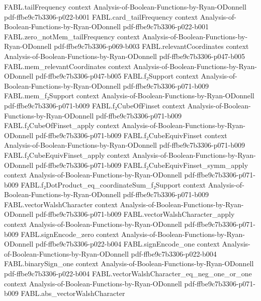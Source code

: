\begin{theorem}
\proofstep
  {FABL.tailFrequency}
  {context}
  {Analysis-of-Boolean-Functions-by-Ryan-ODonnell}
  {pdf-ffbe9c7b3306-p022-b001}
\proofstep
  {FABL.card_tailFrequency}
  {context}
  {Analysis-of-Boolean-Functions-by-Ryan-ODonnell}
  {pdf-ffbe9c7b3306-p022-b001}
\proofstep
  {FABL.zero_notMem_tailFrequency}
  {context}
  {Analysis-of-Boolean-Functions-by-Ryan-ODonnell}
  {pdf-ffbe9c7b3306-p069-b003}
\proofstep
  {FABL.relevantCoordinates}
  {context}
  {Analysis-of-Boolean-Functions-by-Ryan-ODonnell}
  {pdf-ffbe9c7b3306-p047-b005}
\proofstep
  {FABL.mem_relevantCoordinates}
  {context}
  {Analysis-of-Boolean-Functions-by-Ryan-ODonnell}
  {pdf-ffbe9c7b3306-p047-b005}
\proofstep
  {FABL.f₂Support}
  {context}
  {Analysis-of-Boolean-Functions-by-Ryan-ODonnell}
  {pdf-ffbe9c7b3306-p071-b009}
\proofstep
  {FABL.mem_f₂Support}
  {context}
  {Analysis-of-Boolean-Functions-by-Ryan-ODonnell}
  {pdf-ffbe9c7b3306-p071-b009}
\proofstep
  {FABL.f₂CubeOfFinset}
  {context}
  {Analysis-of-Boolean-Functions-by-Ryan-ODonnell}
  {pdf-ffbe9c7b3306-p071-b009}
\proofstep
  {FABL.f₂CubeOfFinset_apply}
  {context}
  {Analysis-of-Boolean-Functions-by-Ryan-ODonnell}
  {pdf-ffbe9c7b3306-p071-b009}
\proofstep
  {FABL.f₂CubeEquivFinset}
  {context}
  {Analysis-of-Boolean-Functions-by-Ryan-ODonnell}
  {pdf-ffbe9c7b3306-p071-b009}
\proofstep
  {FABL.f₂CubeEquivFinset_apply}
  {context}
  {Analysis-of-Boolean-Functions-by-Ryan-ODonnell}
  {pdf-ffbe9c7b3306-p071-b009}
\proofstep
  {FABL.f₂CubeEquivFinset_symm_apply}
  {context}
  {Analysis-of-Boolean-Functions-by-Ryan-ODonnell}
  {pdf-ffbe9c7b3306-p071-b009}
\proofstep
  {FABL.f₂DotProduct_eq_coordinateSum_f₂Support}
  {context}
  {Analysis-of-Boolean-Functions-by-Ryan-ODonnell}
  {pdf-ffbe9c7b3306-p071-b009}
\proofstep
  {FABL.vectorWalshCharacter}
  {context}
  {Analysis-of-Boolean-Functions-by-Ryan-ODonnell}
  {pdf-ffbe9c7b3306-p071-b009}
\proofstep
  {FABL.vectorWalshCharacter_apply}
  {context}
  {Analysis-of-Boolean-Functions-by-Ryan-ODonnell}
  {pdf-ffbe9c7b3306-p071-b009}
\proofstep
  {FABL.signEncode_zero}
  {context}
  {Analysis-of-Boolean-Functions-by-Ryan-ODonnell}
  {pdf-ffbe9c7b3306-p022-b004}
\proofstep
  {FABL.signEncode_one}
  {context}
  {Analysis-of-Boolean-Functions-by-Ryan-ODonnell}
  {pdf-ffbe9c7b3306-p022-b004}
\proofstep
  {FABL.binarySign_one}
  {context}
  {Analysis-of-Boolean-Functions-by-Ryan-ODonnell}
  {pdf-ffbe9c7b3306-p022-b004}
\proofstep
  {FABL.vectorWalshCharacter_eq_neg_one_or_one}
  {context}
  {Analysis-of-Boolean-Functions-by-Ryan-ODonnell}
  {pdf-ffbe9c7b3306-p071-b009}
\proofstep
  {FABL.abs_vectorWalshCharacter}

\end{theorem}
